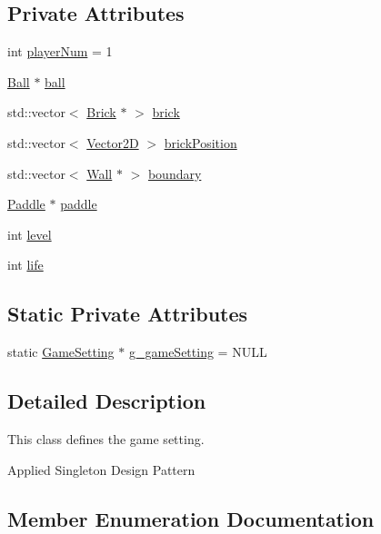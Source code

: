 \subsection*{Private Attributes}
\begin{DoxyCompactItemize}
\item 
int \mbox{\hyperlink{class_game_setting_a6f9dbade2b2ab5139b1199642c9f6d20}{player\+Num}} = 1
\item 
\mbox{\hyperlink{class_ball}{Ball}} $\ast$ \mbox{\hyperlink{class_game_setting_a68eac0fe358985c1a558eb31fd153322}{ball}}
\item 
std\+::vector$<$ \mbox{\hyperlink{class_brick}{Brick}} $\ast$ $>$ \mbox{\hyperlink{class_game_setting_a3ae6006e9dae87449da5dc86925a5bd5}{brick}}
\item 
std\+::vector$<$ \mbox{\hyperlink{struct_vector2_d}{Vector2D}} $>$ \mbox{\hyperlink{class_game_setting_a882501f25355e17b741dab57f4cc36c0}{brick\+Position}}
\item 
std\+::vector$<$ \mbox{\hyperlink{class_wall}{Wall}} $\ast$ $>$ \mbox{\hyperlink{class_game_setting_a719b14dd396546b1a65f3ae123f3ade7}{boundary}}
\item 
\mbox{\hyperlink{class_paddle}{Paddle}} $\ast$ \mbox{\hyperlink{class_game_setting_a2f0c76a0a83b0e800eba1db7e18abf18}{paddle}}
\item 
int \mbox{\hyperlink{class_game_setting_a044d92d8c6698049e7ba0de85204690f}{level}}
\item 
int \mbox{\hyperlink{class_game_setting_a2c124f8326919667baa7a63bd0ac671b}{life}}
\end{DoxyCompactItemize}
\subsection*{Static Private Attributes}
\begin{DoxyCompactItemize}
\item 
static \mbox{\hyperlink{class_game_setting}{Game\+Setting}} $\ast$ \mbox{\hyperlink{class_game_setting_a5c16f0ee98bdaf6475055d6ff1b4e852}{g\+\_\+game\+Setting}} = N\+U\+LL
\end{DoxyCompactItemize}


\subsection{Detailed Description}
This class defines the game setting. 

Applied Singleton Design Pattern 

\subsection{Member Enumeration Documentation}
\mbox{\label{class_game_setting_aeff0cf4cbeffbd2a48db8ac3a06de9f4}} 
